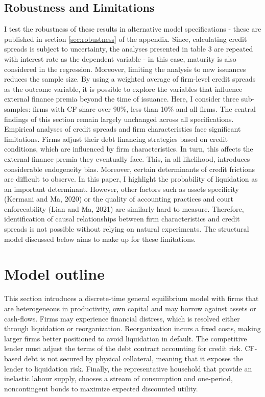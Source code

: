 \documentclass[12pt]{article}
\begin{document}
\subsection{Robustness and Limitations \label{sec:limitations}} 
I test the robustness of these results in alternative model specifications - these are published in section \ref{sec:robustness} of the appendix. Since, calculating credit spreads is subject to uncertainty, the analyses presented in table 3 are repeated with interest rate as the dependent variable - in this case, maturity is also considered in the regression. Moreover, limiting the analysis to new issuances reduces the sample size. By using a weighted average of firm-level credit spreads as the outcome variable, it is possible to explore the variables that influence external finance premia beyond the time of issuance. Here, I consider three sub-samples: firms with CF share over 90\%, less than 10\% and all firms. The central findings of this section remain largely unchanged across all specifications. \vspace{3mm} \\
Empirical analyses of credit spreads and firm characteristics face significant limitations. Firms adjust their debt financing strategies based on credit conditions, which are influenced by firm characteristics. In turn, this affects the external finance premia they eventually face. This, in all likelihood, introduces considerable endogeneity bias. Moreover, certain determinants of credit frictions are difficult to observe. In this paper, I highlight the probability of liquidation as an important determinant. However, other factors such as assets specificity (Kermani and Ma, 2020) or the quality of accounting practices and court enforceability (Lian and Ma, 2021) are similarly hard to measure. Therefore, identification of causal relationships between firm characteristics and credit spreads is not possible without relying on natural experiments. The structural model discussed below aims to make up for these limitations. 

\section{Model outline} \label{sec:model}
This section introduces a discrete-time general equilibrium model with firms that are heterogeneous in productivity, own capital and may borrow against assets or cash-flows. Firms may experience financial distress, which is resolved either through liquidation or reorganization. Reorganization incurs a fixed costs, making larger firms better positioned to avoid liquidation in default. The competitive lender must adjust the terms of the debt contract accounting for credit risk. CF-based debt is not secured by physical collateral, meaning that it exposes the lender to liquidation risk. Finally, the representative household that provide an inelastic labour supply, chooses a stream of consumption and one-period, noncontingent bonds to maximize expected discounted utility. 
\end{document}
